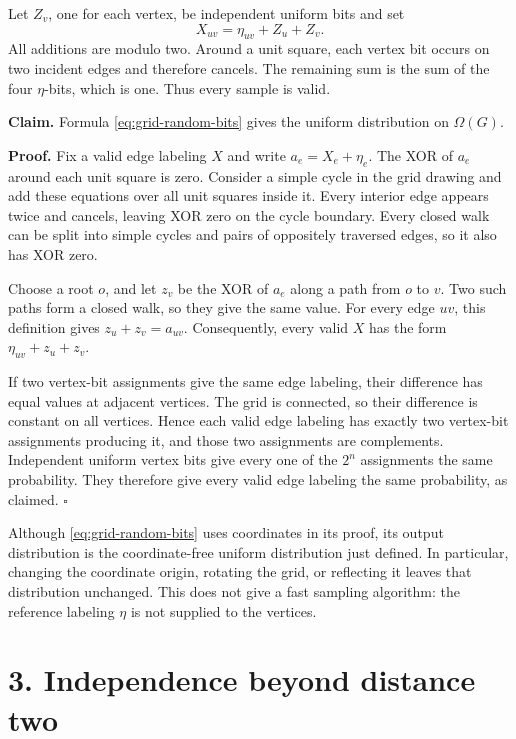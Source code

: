 \documentclass[11pt,a4paper]{article}
\begin{document}
Let \(Z_v\), one for each vertex, be independent uniform bits and set
\begin{equation} X_{uv}=\eta_{uv}+Z_u+Z_v. \label{eq:grid-random-bits} \end{equation}
All additions are modulo two.
Around a unit square, each vertex bit occurs on two incident edges and therefore cancels.
The remaining sum is the sum of the four \(\eta\)-bits, which is one.
Thus every sample is valid.

\textbf{Claim.}
Formula \eqref{eq:grid-random-bits} gives the uniform distribution on \(\Omega(G)\).

\textbf{Proof.}
Fix a valid edge labeling \(X\) and write \(a_e=X_e+\eta_e\).
The XOR of \(a_e\) around each unit square is zero.
Consider a simple cycle in the grid drawing and add these equations over all unit squares inside it.
Every interior edge appears twice and cancels, leaving XOR zero on the cycle boundary.
Every closed walk can be split into simple cycles and pairs of oppositely traversed edges, so it also has XOR zero.

Choose a root \(o\), and let \(z_v\) be the XOR of \(a_e\) along a path from \(o\) to \(v\).
Two such paths form a closed walk, so they give the same value.
For every edge \(uv\), this definition gives \(z_u+z_v=a_{uv}\).
Consequently, every valid \(X\) has the form \(\eta_{uv}+z_u+z_v\).

If two vertex-bit assignments give the same edge labeling, their difference has equal values at adjacent vertices.
The grid is connected, so their difference is constant on all vertices.
Hence each valid edge labeling has exactly two vertex-bit assignments producing it, and those two assignments are complements.
Independent uniform vertex bits give every one of the \(2^n\) assignments the same probability.
They therefore give every valid edge labeling the same probability, as claimed.
\(\square\)

Although \eqref{eq:grid-random-bits} uses coordinates in its proof, its output distribution is the coordinate-free uniform distribution just defined.
In particular, changing the coordinate origin, rotating the grid, or reflecting it leaves that distribution unchanged.
This does not give a fast sampling algorithm: the reference labeling \(\eta\) is not supplied to the vertices.

\section{3. Independence beyond distance two}\label{grid-independence}
\end{document}

